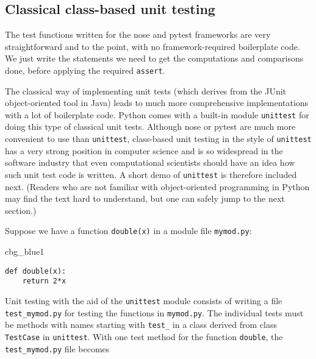\documentclass[graybox,sectrefs,envcountresetchap,open=right,final]{svmonodo}
\newenvironment{_cod_tight}[1]{
   \def\FrameCommand{\colorbox{#1}}
   \FrameRule0.6pt\MakeFramed {\FrameRestore}\vskip3mm}
   {\vskip0mm\endMakeFramed}
\newenvironment{cod}[1]{
\bgroup\rmfamily
\fboxsep=0mm\relax
\begin{_cod_tight}{#1}
\list{}{\parsep=-2mm\parskip=0mm\topsep=0pt\leftmargin=2mm
\rightmargin=2\leftmargin\leftmargin=4pt\relax}
\item\relax}
{\endlist\end{_cod_tight}\egroup}
\begin{document}
\subsection{Classical class-based unit testing}
\label{softeng1:basic:unittest}


The test functions written for the nose and pytest frameworks are
very straightforward and to the point, with no framework-required boilerplate
code. We just write the statements we need to get the computations and
comparisons done, before applying the required \texttt{assert}.

The classical way of implementing unit tests (which derives from the
JUnit object-oriented tool in Java) leads to much more comprehensive
implementations with a lot of boilerplate code.  Python comes with a
built-in module \texttt{unittest} for doing this type of classical unit
tests. Although nose or pytest are much more convenient to use than
\texttt{unittest}, class-based unit testing in the style of \texttt{unittest} has a
very strong position in computer science and is so widespread in
the software industry that
even computational scientists should have an idea how such unit test
code is written. A short demo of \texttt{unittest} is therefore included
next. (Readers who are not familiar with object-oriented programming
in Python may find the text hard to understand, but one can safely
jump to the next section.)

 

Suppose we have a function \texttt{double(x)} in a module file \texttt{mymod.py}:

\begin{cod}{cbg_blue1}\begin{Verbatim}[numbers=none,fontsize=\fontsize{9pt}{9pt},baselinestretch=0.95,xleftmargin=2mm]
def double(x):
    return 2*x
\end{Verbatim}
\end{cod}
\noindent
Unit testing with the aid of the \texttt{unittest} module
consists of writing a file \Verb!test_mymod.py! for testing the functions
in \texttt{mymod.py}. The individual tests must be methods with names
starting with \Verb!test_! in a class derived from class \texttt{TestCase} in
\texttt{unittest}. With one test method for the function \texttt{double}, the
\Verb!test_mymod.py! file becomes
\end{document}
